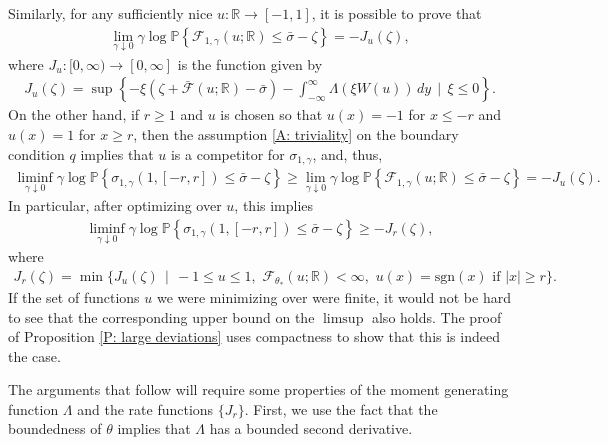 \documentclass[10pt,a4paper]{amsart}
\begin{document}
Similarly, for any sufficiently nice $u : \mathbb{R} \to [-1,1]$, it is possible to prove that
	\begin{align*}
		\lim_{ \gamma \downarrow 0 } \gamma \log \mathbb{P} \left\{ \mathscr{F}_{1,\gamma}(u; \mathbb{R}) \leq \bar{\sigma} - \zeta \right\} = -J_{u}(\zeta),
	\end{align*}
where $J_{u} : [0,\infty) \to [0,\infty]$ is the function given by 
	\begin{align} \label{E: Ju function}
		J_{u}(\zeta) = \sup \left\{ - \xi ( \zeta + \bar{\mathscr{F}}(u;\mathbb{R}) - \bar{\sigma} ) - \int_{-\infty}^{\infty} \Lambda( \xi W(u) ) \, dy \, \mid \, \xi \leq 0 \right\}.
	\end{align}
On the other hand, if $r \geq 1$ and $u$ is chosen so that $u(x) = -1$ for $x \leq -r$ and $u(x) = 1$ for $x \geq r$, then the assumption \eqref{A: triviality} on the boundary condition $q$ implies that $u$ is a competitor for $\sigma_{1,\gamma}$, and, thus,
	\begin{align*}
		\liminf_{ \gamma \downarrow 0 } \gamma \log \mathbb{P} \left\{ \sigma_{1,\gamma}(1,[-r,r]) \leq \bar{\sigma} - \zeta \right \} \geq \lim_{ \gamma \downarrow 0 } \gamma \log \mathbb{P} \left\{ \mathscr{F}_{1,\gamma}(u;\mathbb{R}) \leq \bar{\sigma} - \zeta \right\} = - J_{u}(\zeta).
	\end{align*}
In particular, after optimizing over $u$, this implies
	\begin{gather}
		\liminf_{ \gamma \downarrow 0 } \gamma \log \mathbb{P} \left\{ \sigma_{1,\gamma}(1,[-r,r]) \leq \bar{\sigma} - \zeta \right \} \geq - J_{r}(\zeta), \nonumber 
	\end{gather}
	where	%
	\begin{gather}
		J_{r}(\zeta) = \min \{ J_{u}(\zeta) \, \mid \, -1 \leq u \leq 1, \, \, \mathscr{F}_{\theta_{*}}(u;\mathbb{R}) < \infty, \, \, u(x) = \text{sgn}(x) \, \, \text{if} \, \, |x| \geq r \}. \label{E: definition of Jr}
	\end{gather}
If the set of functions $u$ we were minimizing over were finite, it would not be hard to see that the corresponding upper bound on the $\limsup$ also holds.  The proof of Proposition \ref{P: large deviations} uses compactness  to show that this is indeed the case.

The arguments that follow will require some properties of the moment generating function $\Lambda$ and the rate functions $\{ J_{r} \}$.  First, we use the fact that the boundedness of $\theta$ implies that $\Lambda$ has a bounded second derivative.
\end{document}
